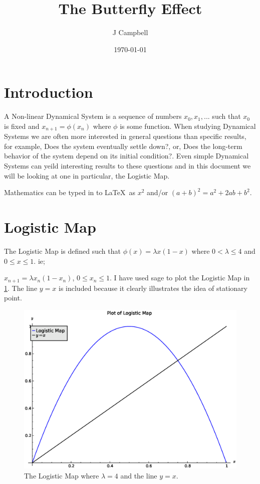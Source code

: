 \documentclass[a4paper]{article}
\title{The Butterfly Effect}
\author{J Campbell}
\date{\today}
\begin{document}

\maketitle

\section{Introduction}
A Non-linear Dynamical System is a sequence of numbers $x_0, x_1, ...$ such that $x_0$ is fixed and $x_{n+1} = \phi(x_n)$ where $\phi$ is some function. When studying Dynamical Systems we are often more interested in general questions than specific results, for example, Does the system eventually settle down?, or, Does the long-term behavior of the system depend on its initial condition?. Even simple Dynamical Systems can yeild interesting results to these questions and in this document we will be looking at one in particular, the Logistic Map.

Mathematics can be typed in to \LaTeX\ as $x^2$ and/or \((a+b)^2=a^2+2ab+b^2\).


\section{Logistic Map}
The Logistic Map is defined such that $\phi(x)=\lambda x(1-x)$ where $ 0 <\lambda \leq 4$ and $0\leq x\leq 1$. ie;

$x_{n+1} = \lambda x_n(1-x_n)$, $0 \leq x_n \leq 1 $. I have used sage to plot the Logistic Map in \ref{logisticmap}. The line $y=x$ is included because it clearly illustrates the idea of stationary point.
\begin{figure}[htdp]
\begin{center}
\includegraphics[scale=0.4]{logisticmap}
\end{center}
\caption{The Logistic Map where $\lambda = 4$ and the line $y = x$.}
\label{logisticmap}
\end{figure}
\end{document}
